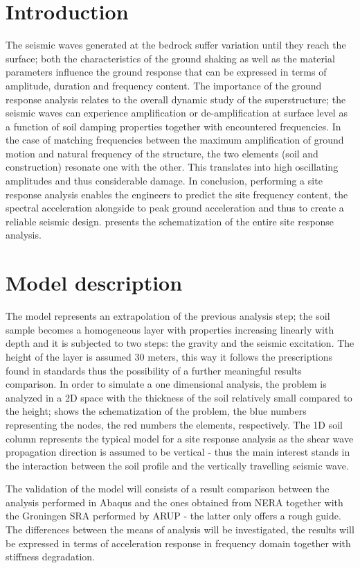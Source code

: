 \documentclass[10pt,a4paper]{report}
\begin{document}
		\section{Introduction}
The seismic waves generated at the bedrock suffer variation until they reach the surface; both the characteristics of the ground shaking as well as the material parameters influence the ground response that can be expressed in terms of amplitude, duration and frequency content. The importance of the ground response analysis relates to the overall dynamic study of the superstructure; the seismic waves can experience amplification or de-amplification at surface level as a function of soil damping properties together with encountered frequencies. In the case of matching frequencies between the maximum amplification of ground motion and natural frequency of the structure, the two elements (soil and construction) resonate one with the other. This translates into high oscillating amplitudes and thus considerable damage. In conclusion, performing a site response analysis enables the engineers to predict the site frequency content, the spectral acceleration alongside to peak ground acceleration and thus to create a reliable seismic design. \label{Figure 1}presents the schematization of the entire site response analysis.
	
		
		\section{Model description}
The model represents an extrapolation of the previous analysis step; the soil sample becomes a homogeneous layer with properties increasing linearly with depth and it is subjected to two steps: the gravity and the seismic excitation. The height of the layer is assumed 30 meters, this way it follows the prescriptions found in standards thus the possibility of a further meaningful results comparison. In order to simulate a one dimensional analysis, the problem is analyzed in a 2D space with the thickness of the soil relatively small compared to the height; \label{fig:Soilcolumn} shows the schematization of the problem, the blue numbers representing the nodes, the red numbers the elements, respectively. The 1D soil column represents the typical model for a site response analysis as the shear wave propagation direction is assumed to be vertical - thus the main interest stands in the interaction between the soil profile and the vertically travelling seismic wave. 

The validation of the model will consists of a result comparison between the analysis performed in Abaqus and the ones obtained from NERA together with the Groningen SRA performed by ARUP - the latter only offers a rough guide. The differences between the means of analysis will be investigated, the results will be expressed in terms of acceleration response in frequency domain together with stiffness degradation. 
\end{document}
